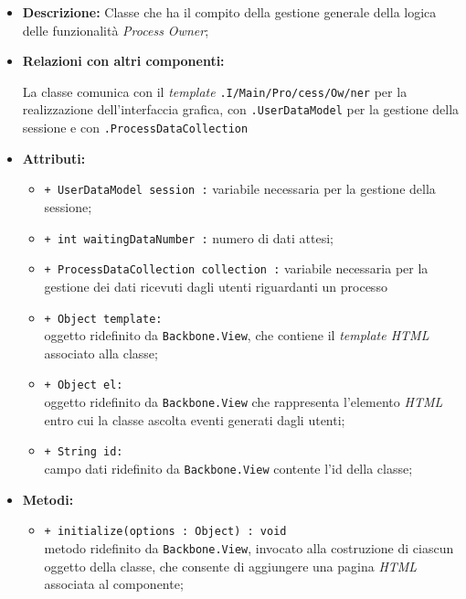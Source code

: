 \begin{flushleft}
\begin{itemize}
\item \textbf{Descrizione:} Classe che ha il compito della gestione generale della logica delle funzionalità \textit{Process Owner};
\item \textbf{Relazioni con altri componenti:}
\begin{sloppypar}
La classe comunica con il \textit{template} \texttt{\viewAdmin{}.I\fshyp{}Main\fshyp{}Pro\fshyp{}cess\fshyp{}Ow\fshyp{}ner} per la realizzazione dell'interfaccia grafica, con \texttt{\model{}.UserDataModel} per la gestione della sessione e con \texttt{\collectionp{}.ProcessDataCollection}
\end{sloppypar}
\item \textbf{Attributi:}
\begin{sloppypar}
\begin{itemize}
\item \texttt{+ UserDataModel session :} variabile necessaria per la gestione della sessione;
\item \texttt{+ int waitingDataNumber :} numero di dati attesi;
\item \texttt{+ ProcessDataCollection collection :} variabile necessaria per la gestione dei dati ricevuti dagli utenti riguardanti un processo
\item \texttt{+ Object template:}\\ oggetto ridefinito da \texttt{Backbone.View}, che contiene il \textit{template HTML} associato alla classe;
\item \texttt{+ Object el:}\\ oggetto ridefinito da \texttt{Backbone.View} che rappresenta l'elemento \textit{HTML} entro cui la classe ascolta eventi generati dagli utenti;
\item \texttt{+ String id:}\\ campo dati ridefinito da \texttt{Backbone.View} contente l'id della classe;
\end{itemize}
\end{sloppypar}
\item \textbf{Metodi:}
\begin{sloppypar}
\begin{itemize}
\item \texttt{+ initialize(options : Object) : void}\\ metodo ridefinito da \texttt{Backbone.View}, invocato alla costruzione di ciascun oggetto della classe, che consente di aggiungere una pagina \textit{HTML} associata al componente;

\end{itemize}
\end{sloppypar}
\end{itemize}
\end{flushleft}
